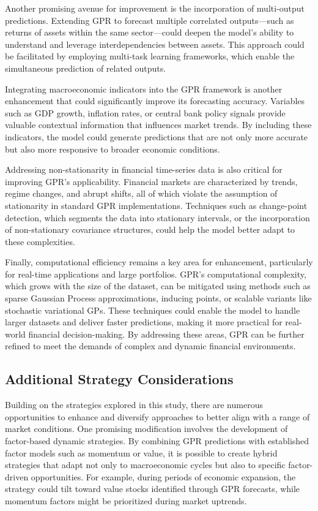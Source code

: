 Another promising avenue for improvement is the incorporation of multi-output predictions. Extending GPR to forecast multiple correlated outputs—such as returns of assets within the same sector—could deepen the model’s ability to understand and leverage interdependencies between assets. This approach could be facilitated by employing multi-task learning frameworks, which enable the simultaneous prediction of related outputs.

Integrating macroeconomic indicators into the GPR framework is another enhancement that could significantly improve its forecasting accuracy. Variables such as GDP growth, inflation rates, or central bank policy signals provide valuable contextual information that influences market trends. By including these indicators, the model could generate predictions that are not only more accurate but also more responsive to broader economic conditions.

Addressing non-stationarity in financial time-series data is also critical for improving GPR's applicability. Financial markets are characterized by trends, regime changes, and abrupt shifts, all of which violate the assumption of stationarity in standard GPR implementations. Techniques such as change-point detection, which segments the data into stationary intervals, or the incorporation of non-stationary covariance structures, could help the model better adapt to these complexities.

Finally, computational efficiency remains a key area for enhancement, particularly for real-time applications and large portfolios. GPR’s computational complexity, which grows with the size of the dataset, can be mitigated using methods such as sparse Gaussian Process approximations, inducing points, or scalable variants like stochastic variational GPs. These techniques could enable the model to handle larger datasets and deliver faster predictions, making it more practical for real-world financial decision-making. By addressing these areas, GPR can be further refined to meet the demands of complex and dynamic financial environments.

\subsection{Additional Strategy Considerations}
Building on the strategies explored in this study, there are numerous opportunities to enhance and diversify approaches to better align with a range of market conditions. One promising modification involves the development of factor-based dynamic strategies. By combining GPR predictions with established factor models such as momentum or value, it is possible to create hybrid strategies that adapt not only to macroeconomic cycles but also to specific factor-driven opportunities. For example, during periods of economic expansion, the strategy could tilt toward value stocks identified through GPR forecasts, while momentum factors might be prioritized during market uptrends.

